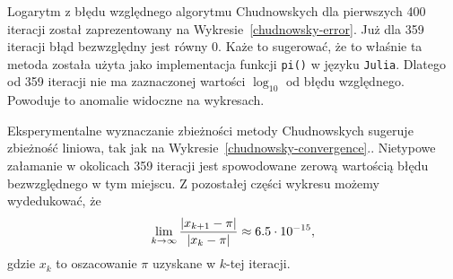 Logarytm z błędu względnego algorytmu Chudnowskych dla pierwszych 400 iteracji został zaprezentowany na Wykresie~\ref{chudnowsky-error}. Już dla 359 iteracji błąd bezwzględny jest równy 0. Każe to sugerować, że to właśnie ta metoda została użyta jako implementacja funkcji \verb+pi()+ w języku \verb+Julia+. Dlatego od 359 iteracji nie ma zaznaczonej wartości $\log_{10}$ od błędu względnego. Powoduje to anomalie widoczne na wykresach.

Eksperymentalne wyznaczanie zbieżności metody Chudnowskych sugeruje zbieżność liniowa, tak jak na Wykresie~\ref{chudnowsky-convergence}.. Nietypowe załamanie w okolicach 359 iteracji jest spowodowane zerową wartością błędu bezwzględnego w tym miejscu. Z pozostałej części wykresu możemy wydedukować, że
$$\lim_{k\to\infty}{{|x_{k+1}-\pi|\over |x_k-\pi|}}\approx 6.5\cdot 10^{-15},$$
gdzie $x_k$ to oszacowanie $\pi$ uzyskane w $k$-tej iteracji.